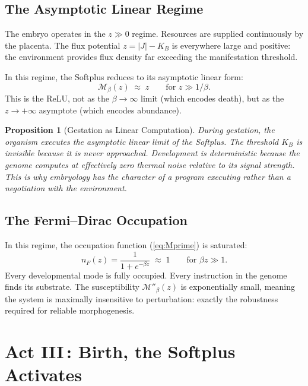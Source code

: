 \documentclass[12pt, letterpaper]{article}
\theoremstyle{plain}
\newtheorem{proposition}[theorem]{Proposition}
\theoremstyle{definition}
\theoremstyle{remark}
\newcommand{\Mop}{\mathcal{M}}            %
\newcommand{\KB}{K_{\!B}}                 %
\newcommand{\nF}{n_{\!F}}                 %
\begin{document}
\subsection{The Asymptotic Linear Regime}

The embryo operates in the $z \gg 0$ regime. Resources are supplied continuously by the placenta. The flux potential $z = |J| - \KB$ is everywhere large and positive: the environment provides flux density far exceeding the manifestation threshold.

In this regime, the Softplus reduces to its asymptotic linear form:
\begin{equation}\label{eq:gestation_relu}
  \Mop_\beta(z) \;\approx\; z
  \qquad \text{for } z \gg 1/\beta.
\end{equation}
This is the ReLU, not as the $\beta \to \infty$ limit (which encodes death), but as the $z \to +\infty$ asymptote (which encodes abundance).

\begin{proposition}[Gestation as Linear Computation]\label{prop:gestation}
  During gestation, the organism executes the asymptotic linear limit of the Softplus. The threshold $\KB$ is invisible because it is never approached. Development is deterministic because the genome computes at effectively zero thermal noise relative to its signal strength. This is why embryology has the character of a program executing rather than a negotiation with the environment.
\end{proposition}

\subsection{The Fermi--Dirac Occupation}

In this regime, the occupation function (\ref{eq:Mprime}) is saturated:
\begin{equation}
  \nF(z) = \frac{1}{1 + e^{-\beta z}} \;\approx\; 1
  \qquad \text{for } \beta z \gg 1.
\end{equation}
Every developmental mode is fully occupied. Every instruction in the genome finds its substrate. The susceptibility $\Mop''_\beta(z)$ is exponentially small, meaning the system is maximally insensitive to perturbation: exactly the robustness required for reliable morphogenesis.


\section{\texorpdfstring{Act III\,: Birth, the Softplus Activates}{Act III: Birth, the Softplus Activates}}
\label{sec:act3}
\end{document}
